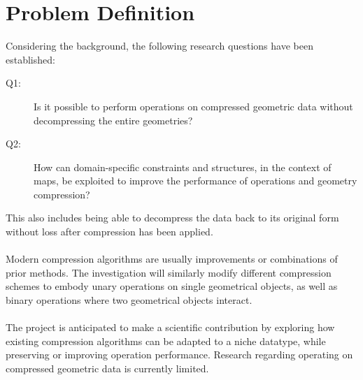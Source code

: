 \section{Problem Definition}
Considering the background, the following research questions have been established:
\begin{description}
    \item[Q1:] Is it possible to perform operations on compressed geometric data without decompressing the entire geometries?
    \item[Q2:] How can domain-specific constraints and structures, in the context of maps, be exploited to improve the performance of operations and geometry compression?
\end{description}
This also includes being able to decompress the data back to its original form without loss after compression has been applied.
 \\\\
Modern compression algorithms are usually improvements or combinations of prior methods. The investigation will similarly modify different compression schemes to embody unary operations on single geometrical objects, as well as binary operations where two geometrical objects interact. 
\\\\
The project is anticipated to make a scientific contribution by exploring how existing compression algorithms can be adapted to a niche datatype, while preserving or improving operation performance. Research regarding operating on compressed geometric data is currently limited.

\label{scopeLimit}
